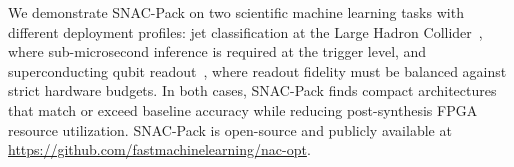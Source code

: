 \documentclass[11pt]{article}
\begin{document}
We demonstrate SNAC-Pack on two scientific machine learning tasks with different deployment profiles: jet classification at the Large Hadron Collider~\citep{pierini_2020_3602260}, where sub-microsecond inference is required at the trigger level, and superconducting qubit readout~\citep{diguglielmo2025endtoendworkflowmachinelearningbased}, where readout fidelity must be balanced against strict hardware budgets.
In both cases, SNAC-Pack finds compact architectures that match or exceed baseline accuracy while reducing post-synthesis FPGA resource utilization.
SNAC-Pack is open-source and publicly available at \url{https://github.com/fastmachinelearning/nac-opt}.






\end{document}
